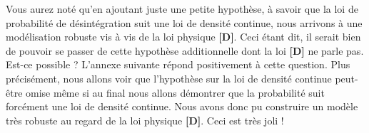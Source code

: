 Vous aurez noté qu'en ajoutant juste une petite hypothèse, à savoir que la loi de probabilité de désintégration suit une loi  de densité continue, nous arrivons à une modélisation robuste vis à vis de la loi physique \textbf{[D]}.
Ceci étant dit, il serait bien de pouvoir se passer de cette hypothèse additionnelle dont la loi \textbf{[D]} ne parle pas. Est-ce possible ? L'annexe suivante répond positivement à cette question. Plus précisément, nous allons voir que l'hypothèse sur la loi de densité continue peut-être omise même si au final nous allons démontrer que la probabilité suit forcément une loi de densité continue. Nous avons donc pu construire un modèle très robuste au regard de la loi physique \textbf{[D]}. Ceci est très joli !